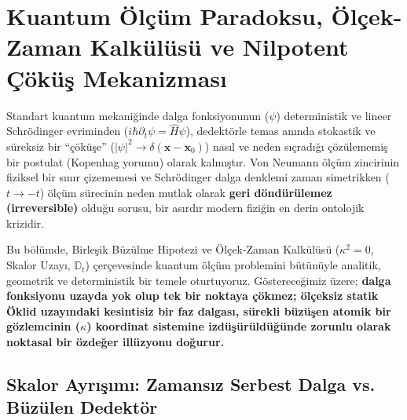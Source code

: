\section{Kuantum Ölçüm Paradoksu, Ölçek-Zaman Kalkülüsü ve Nilpotent Çöküş Mekanizması}
\label{sec:kuantum_olcum_main}

Standart kuantum mekaniğinde dalga fonksiyonunun ($\psi$) deterministik ve lineer Schrödinger evriminden ($i\hbar \partial_t \psi = \hat{H}\psi$), dedektörle temas anında stokastik ve süreksiz bir ``çöküşe'' ($|\psi|^2 \to \delta(\mathbf{x} - \mathbf{x}_0)$) nasıl ve neden sıçradığı çözülememiş bir postulat (Kopenhag yorumu) olarak kalmıştır. Von Neumann ölçüm zincirinin fiziksel bir sınır çizememesi ve Schrödinger dalga denklemi zaman simetrikken ($t \to -t$) ölçüm sürecinin neden mutlak olarak \textbf{geri döndürülemez (irreversible)} olduğu sorusu, bir asırdır modern fiziğin en derin ontolojik krizidir.

Bu bölümde, Birleşik Büzülme Hipotezi ve Ölçek-Zaman Kalkülüsü ($\kappa^2 = 0$, Skalor Uzayı, $\mathbb{D}_t$) çerçevesinde kuantum ölçüm problemini bütünüyle analitik, geometrik ve deterministik bir temele oturtuyoruz. Göstereceğimiz üzere; \textbf{dalga fonksiyonu uzayda yok olup tek bir noktaya çökmez; ölçeksiz statik Öklid uzayındaki kesintisiz bir faz dalgası, sürekli büzüşen atomik bir gözlemcinin ($\kappa$) koordinat sistemine izdüşürüldüğünde zorunlu olarak noktasal bir özdeğer illüzyonu doğurur.}

\subsection{Skalor Ayrışımı: Zamansız Serbest Dalga vs. Büzülen Dedektör}
\label{sec:skalor_ayrisimi}

